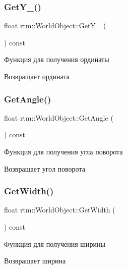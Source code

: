 \subsubsection{\texorpdfstring{Get\+Y\+\_\+()}{GetY\_()}}
{\footnotesize\ttfamily float rtm\+::\+World\+Object\+::\+Get\+Y\+\_\+ (\begin{DoxyParamCaption}{ }\end{DoxyParamCaption}) const}

Функция для получения ординаты \begin{DoxyReturn}{Возвращает}
ордината 
\end{DoxyReturn}
\mbox{\label{classrtm_1_1_world_object_ae9af0e03a3f49720b38ec69191c8d237}} 
\subsubsection{\texorpdfstring{Get\+Angle()}{GetAngle()}}
{\footnotesize\ttfamily float rtm\+::\+World\+Object\+::\+Get\+Angle (\begin{DoxyParamCaption}{ }\end{DoxyParamCaption}) const}

Функция для получения угла поворота \begin{DoxyReturn}{Возвращает}
угол поворота 
\end{DoxyReturn}
\mbox{\label{classrtm_1_1_world_object_a36a9cf3cce5c76f88164e0c790675a1e}} 
\subsubsection{\texorpdfstring{Get\+Width()}{GetWidth()}}
{\footnotesize\ttfamily float rtm\+::\+World\+Object\+::\+Get\+Width (\begin{DoxyParamCaption}{ }\end{DoxyParamCaption}) const}

Функция для получения ширины \begin{DoxyReturn}{Возвращает}
ширина 
\end{DoxyReturn}
\mbox{\label{classrtm_1_1_world_object_ac1ab514e4556b3d8b9d4ffda5eba9db2}} 
